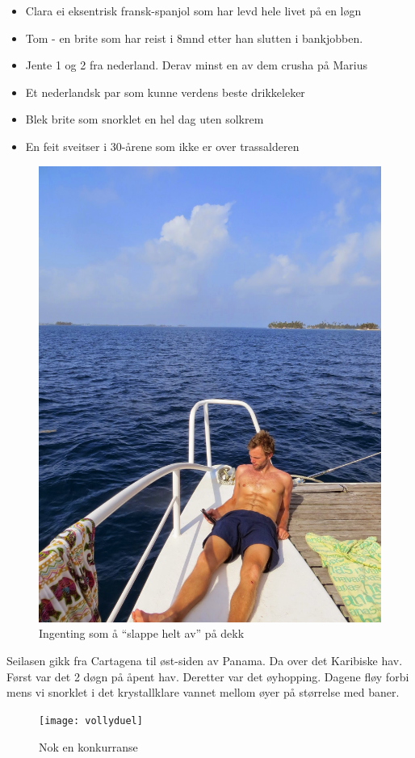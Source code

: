 \begin{itemize}
	\item Clara ei eksentrisk fransk-spanjol som har levd hele
		livet på en løgn
	\item Tom - en brite som har reist i 8mnd etter han slutten i
		bankjobben.
	\item Jente 1 og 2 fra nederland. Derav minst en av dem crusha på Marius
	\item Et nederlandsk par som kunne verdens beste drikkeleker
	\item Blek brite som snorklet en hel dag uten solkrem
	\item En feit sveitser i 30-årene som ikke er over
		trassalderen
\end{itemize}
\begin{figure}[H]
	\centering
	\includegraphics[width=\textwidth]{flex}
	\caption{Ingenting som å ``slappe helt av'' på dekk}
	\label{fig:tintin}
\end{figure}
Seilasen gikk fra Cartagena til øst-siden av Panama. Da over det
Karibiske hav. Først var det 2 døgn på åpent hav. Deretter var det
øyhopping. Dagene fløy forbi mens vi snorklet i det krystallklare vannet
mellom øyer på størrelse med baner.
\begin{figure}[H]
	\centering
	\texttt{[image: vollyduel]}
	\caption{Nok en konkurranse}
	\label{fig:volley}
\end{figure}


